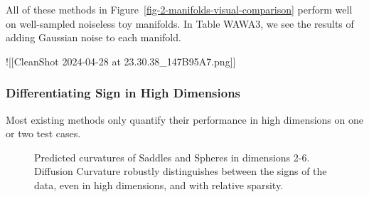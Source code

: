 \documentclass[
  letterpaper,
  DIV=11,
  numbers=noendperiod]{scrartcl}
\theoremstyle{plain}
\theoremstyle{plain}
\theoremstyle{definition}
\theoremstyle{definition}
\theoremstyle{remark}
\begin{document}
All of these methods in Figure~\ref{fig-2-manifolds-visual-comparison}
perform well on well-sampled noiseless toy manifolds. In Table WAWA3, we
see the results of adding Gaussian noise to each manifold.

!{[}{[}CleanShot 2024-04-28 at 23.30.38\_147B95A7.png{]}{]}

\subsubsection{Differentiating Sign in High
Dimensions}\label{differentiating-sign-in-high-dimensions}

Most existing methods only quantify their performance in high dimensions
on one or two test cases.

\begin{figure}[H]


\caption{\label{fig-sadspheres}Predicted curvatures of Saddles and
Spheres in dimensions 2-6. Diffusion Curvature robustly distinguishes
between the signs of the data, even in high dimensions, and with
relative sparsity.}

\end{figure}%
\end{document}
